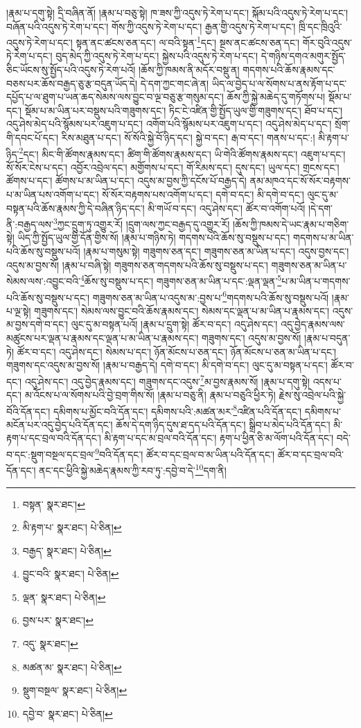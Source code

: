 །རྣམ་པ་དགུ་སྟེ། དྲི་བཞིན་ནོ། །རྣམ་པ་བཅུ་སྟེ། ཁ་ཟས་ཀྱི་འདུས་ཏེ་རེག་པ་དང་། སྐོམ་པའི་འདུས་ཏེ་རེག་པ་དང་། བཞོན་པའི་འདུས་ཏེ་རེག་པ་དང་། གོས་ཀྱི་འདུས་ཏེ་རེག་པ་དང་། རྒྱན་གྱི་འདུས་ཏེ་རེག་པ་དང་། ཁྲི་དང་ཁྲིའུའི་འདུས་ཏེ་རེག་པ་དང་། སྟན་ནང་ཚངས་ཅན་དང་། ལ་བའི་སྟན་\footnote{བསྟན་  སྣར་ཐང་། }དང་། སྔས་ནང་ཚངས་ཅན་དང་། གོར་བུའི་འདུས་ཏེ་རེག་པ་དང་། བུད་མེད་ཀྱི་འདུས་ཏེ་རེག་པ་དང་། སྐྱེས་པའི་འདུས་ཏེ་རེག་པ་དང་། དེ་གཉིས་དགའ་མགུར་སྤྱོད་ཅིང་ཡོངས་སུ་སྤྱོད་པའི་འདུས་ཏེ་རེག་པའོ། །ཆོས་ཀྱི་ཁམས་ནི་མདོར་བསྡུ་ན། གདགས་པའི་ཆོས་རྣམས་དང་བཅས་པར་ཆོས་བརྒྱད་ཅུ་རྩ་བདུན་ཡོད་དེ། དེ་དག་ཀྱང་གང་ཞེ་ན། ཡིད་ལ་བྱེད་པ་ལ་སོགས་པ་ནས་རྟོག་པ་དང་དཔྱོད་པ་ལ་ཐུག་པ་ཡན་ཆད་སེམས་ལས་བྱུང་བ་ལྔ་བཅུ་རྩ་གསུམ་དང་། ཆོས་ཀྱི་སྐྱེ་མཆེད་དུ་གཏོགས་པ། སྡོམ་པ་དང་། སྡོམ་པ་མ་ཡིན་པར་བསྡུས་པའི་གཟུགས་དང་། ཏིང་ངེ་འཛིན་གྱི་སྤྱོད་ཡུལ་གྱི་གཟུགས་དང་། ཐོབ་པ་དང་། འདུ་ཤེས་མེད་པའི་སྙོམས་པར་འཇུག་པ་དང་། འགོག་པའི་སྙོམས་པར་འཇུག་པ་དང་། འདུ་ཤེས་མེད་པ་དང་། སྲོག་གི་དབང་པོ་དང་། རིས་མཐུན་པ་དང་། སོ་སོའི་སྐྱེ་བོ་ཉིད་དང་། སྐྱེ་བ་དང་། རྒ་བ་དང་། གནས་པ་དང་:། མི་རྟག་པ་ཉིད་\footnote{མི་རྟག་པ་  སྣར་ཐང་།  པེ་ཅིན། }དང་། མིང་གི་ཚོགས་རྣམས་དང་། ཚིག་གི་ཚོགས་རྣམས་དང་། ཡི་གེའི་ཚོགས་རྣམས་དང་། འཇུག་པ་དང་། སོ་སོར་ངེས་པ་དང་། འབྱོར་འབྲེལ་དང་། མགྱོགས་པ་དང་། གོ་རིམས་དང་། དུས་དང་། ཡུལ་དང་། གྲངས་དང་། ཚོགས་པ་དང་། ཚོགས་པ་མ་ཡིན་པ་དང་། འདུས་མ་བྱས་ཀྱི་དངོས་པོ་བརྒྱད་དེ། ནམ་མཁའ་དང་སོ་སོར་བརྟགས་པ་མ་ཡིན་པས་འགོག་པ་དང་། སོ་སོར་བརྟགས་པས་འགོག་པ་དང་། དགེ་བ་དང་། མི་དགེ་བ་དང་། ལུང་དུ་མ་བསྟན་པའི་ཆོས་རྣམས་ཀྱི་དེ་བཞིན་ཉིད་དང་། མི་གཡོ་བ་དང་། འདུ་ཤེས་དང་། ཚོར་བ་འགོག་པའོ། །དེ་དག་ནི་:བརྒྱད་ལས་\footnote{བརྒྱད་  སྣར་ཐང་།  པེ་ཅིན། }ཀྱང་དྲུག་ཏུ་འགྱུར་རོ། །དྲུག་ལས་ཀྱང་བརྒྱད་དུ་འགྱུར་རོ། །ཆོས་ཀྱི་ཁམས་དེ་ཡང་རྣམ་པ་གཅིག་སྟེ། ཡིད་ཀྱི་སྤྱོད་ཡུལ་གྱི་དོན་གྱིས་སོ། །རྣམ་པ་གཉིས་ཏེ། གདགས་པའི་ཆོས་སུ་བསྡུས་པ་དང་། གདགས་པ་མ་ཡིན་པའི་ཆོས་སུ་བསྡུས་པའོ། །རྣམ་པ་གསུམ་སྟེ། གཟུགས་ཅན་དང་། གཟུགས་ཅན་མ་ཡིན་པ་དང་། འདུས་བྱས་དང་། འདུས་མ་བྱས་སོ། །རྣམ་པ་བཞི་སྟེ། གཟུགས་ཅན་གདགས་པའི་ཆོས་སུ་བསྡུས་པ་དང་། གཟུགས་ཅན་མ་ཡིན་པ་སེམས་ལས་:འབྱུང་བའི་\footnote{བྱུང་བའི་  སྣར་ཐང་།  པེ་ཅིན། }ཆོས་སུ་བསྡུས་པ་དང་། གཟུགས་ཅན་མ་ཡིན་པ་དང་:ལྡན་ལྡན་\footnote{ལྡན་  སྣར་ཐང་།  པེ་ཅིན། }པ་མ་ཡིན་པ་གདགས་པའི་ཆོས་སུ་བསྡུས་པ་དང་། གཟུགས་ཅན་མ་ཡིན་པ་འདུས་མ་:བྱས་པ་\footnote{བྱས་པར་  སྣར་ཐང་། }གདགས་པའི་ཆོས་སུ་བསྡུས་པའོ། །རྣམ་པ་ལྔ་སྟེ། གཟུགས་དང་། སེམས་ལས་བྱུང་བའི་ཆོས་རྣམས་དང་། སེམས་དང་ལྡན་པ་མ་ཡིན་པ་རྣམས་དང་། འདུས་མ་བྱས་དགེ་བ་དང་། ལུང་དུ་མ་བསྟན་པའོ། །རྣམ་པ་དྲུག་སྟེ། ཚོར་བ་དང་། འདུ་ཤེས་དང་། འདུ་བྱེད་རྣམས་ལས་མཚུངས་པར་ལྡན་པ་རྣམས་དང་ལྡན་པ་མ་ཡིན་པ་རྣམས་དང་། གཟུགས་དང་། འདུས་མ་བྱས་སོ། །རྣམ་པ་བདུན་ཏེ། ཚོར་བ་དང་། འདུ་ཤེས་དང་། སེམས་པ་དང་། ཉོན་མོངས་པ་ཅན་དང་། ཉོན་མོངས་པ་ཅན་མ་ཡིན་པ་དང་། གཟུགས་དང་འདུས་མ་བྱས་སོ། །རྣམ་པ་བརྒྱད་དེ། དགེ་བ་དང་། མི་དགེ་བ་དང་། ལུང་དུ་མ་བསྟན་པ་དང་། ཚོར་བ་དང་། འདུ་ཤེས་དང་། འདུ་བྱེད་རྣམས་དང་། གཟུགས་དང་འདུས་\footnote{འདུ་  སྣར་ཐང་། }མ་བྱས་རྣམས་སོ། །རྣམ་པ་དགུ་སྟེ། འདས་པ་དང་། མ་འོངས་པ་ལ་སོགས་པའི་བྱེ་བྲག་གིས་སོ། །རྣམ་པ་བཅུ་ནི། རྣམ་པ་བཅུའི་ཕྱིར་ཏེ། རྗེས་སུ་འབྲེལ་པའི་སྐྱེ་བོའི་དོན་དང་། དམིགས་པ་མྱོང་བའི་དོན་དང་། དམིགས་པའི་:མཚན་མར་\footnote{མཚན་མ་  སྣར་ཐང་།  པེ་ཅིན། }འཛིན་པའི་དོན་དང་། དམིགས་པ་མངོན་པར་འདུ་བྱེད་པའི་དོན་དང་། ཆོས་དེ་དག་ཉིད་དུས་ཐ་དད་པའི་དོན་དང་། སྒྲིབ་པ་མེད་པའི་དོན་དང་། མི་རྟག་པ་དང་བྲལ་བའི་དོན་དང་། མི་རྟག་པ་དང་མ་བྲལ་བའི་དོན་དང་། རྟག་པ་ཕྱིན་ཅི་མ་ལོག་པའི་དོན་དང་། བདེ་བ་དང་:སྡུག་བསྔལ་དང་བྲལ་\footnote{སྡུག་བསྔལ་  སྣར་ཐང་།  པེ་ཅིན། }བའི་དོན་དང་། ཚོར་བ་དང་བྲལ་བ་མ་ཡིན་པའི་དོན་དང་། ཚོར་བ་དང་བྲལ་བའི་དོན་དང་། ནང་དང་ཕྱིའི་སྐྱེ་མཆེད་རྣམས་ཀྱི་རབ་ཏུ་:དབྱེ་བ་དེ་\footnote{དབྱེ་བ་  སྣར་ཐང་།  པེ་ཅིན། }དག་ནི། 